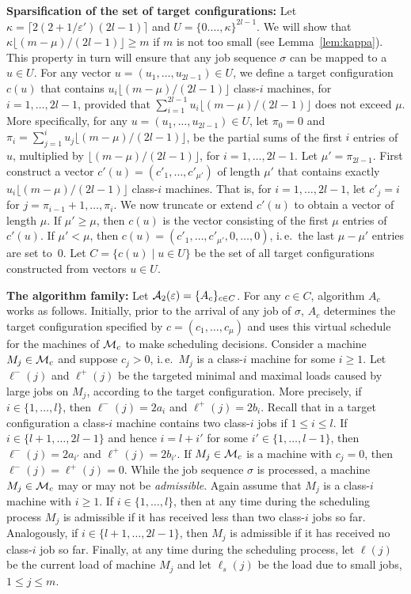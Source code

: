 \documentclass{llncs}
\newcommand{\eps}{\varepsilon}
\begin{document}
{\bf Sparsification of the set of target configurations:} Let $\kappa = \lceil 2(2+1/\eps')(2l-1)\rceil$ and
$U = \{0.\ldots, \kappa\}^{2l-1}$. We will show that 
$\kappa \lfloor (m-\mu)/(2l-1) \rfloor \geq m$ if $m$ is not too small (see Lemma~\ref{lem:kappa}).
This property in turn will ensure that any job sequence $\sigma$ can be mapped to a $u\in U$.
For any vector $u = (u_1, \ldots, u_{2l-1})\in U$, we define a target configuration
$c(u)$ that contains $u_i \lfloor (m-\mu)/(2l-1) \rfloor$ class-$i$ machines, for $i=1, \ldots, 2l-1$, 
provided that $\sum_{i=1}^{2l-1} u_i \lfloor (m-\mu)/(2l-1) \rfloor$ does not exceed $\mu$. More specifically,
for any $u = (u_1, \ldots, u_{2l-1})\in U$, let $\pi_0=0$ and $\pi_i = \sum_{j=1}^i u_j \lfloor (m-\mu)/(2l-1) \rfloor$,
be the partial sums of the first $i$ entries of $u$, multiplied by $\lfloor (m-\mu)/(2l-1) \rfloor$, for
$i=1, \ldots, 2l-1$. Let $\mu'= \pi_{2l-1}$. First construct a vector $c'(u) = (c'_1, \ldots, c'_{\mu'})$
of length $\mu'$ that contains exactly $u_i \lfloor (m-\mu)/(2l-1) \rfloor$ class-$i$ machines.
That is, for $i=1, \ldots, 2l-1$, let $c'_j = i$ for $j=\pi_{i-1}+1, \ldots, \pi_i$. We now truncate
or extend $c'(u)$ to obtain a vector of length $\mu$. If $\mu'\geq \mu$, then $c(u)$ is the vector consisting
of the first $\mu$ entries of $c'(u)$. If $\mu'< \mu$, then $c(u) = (c'_1, \ldots, c'_{\mu'}, 0, \ldots, 0)$, i.\,e.\
the last $\mu-\mu'$ entries are set to~0. Let $C= \{c(u) \mid u\in U\}$ be the set of all target configurations
constructed from vectors $u\in U$.

{\bf The algorithm family:} Let ${\cal A}_2(\eps) = \{A_c\}_{c\in C}$. For any $c\in C$, algorithm
$A_c$ works as follows. Initially, prior to the arrival of any job of $\sigma$, $A_c$ determines
the target configuration specified by $c= (c_1, \ldots, c_{\mu})$ and uses this virtual schedule for
the machines of ${\cal M}_c$ to make scheduling decisions. Consider a machine $M_j\in {\cal M}_c$ and
suppose $c_j >0$, i.\,e.\ $M_j$ is a class-$i$ machine  for some $i\geq 1$. Let $\ell^-(j)$ and $\ell^+(j)$
be the targeted minimal and maximal loads caused by large jobs on $M_j$, according to the target
configuration. More precisely, if $i\in \{1,\ldots, l\}$, then  $\ell^-(j) = 2a_i$ and  $\ell^+(j)=2b_i$. 
Recall that in a target configuration a class-$i$ machine contains two class-$i$ jobs if $1\leq i \leq l$.
If $i\in \{l+1,\ldots, 2l-1\}$ and hence $i = l+i'$ for some $i'\in \{1,\ldots, l-1\}$, then  $\ell^-(j) = 2a_{i'}$ 
and  $\ell^+(j)=2b_{i'}$. If $M_j \in {\cal M}_c$ is 
a machine with $c_j = 0$, then $ \ell^-(j)  = \ell^+(j) = 0$. While the job sequence $\sigma$ is processed,
a machine $M_j\in {\cal M}_c$ may or may not be {\em admissible\/}. Again assume that $M_j$ is a class-$i$
machine with $i\geq 1$. If $i\in \{1, \ldots, l\}$, then at any time during the scheduling process $M_j$ is
admissible if it has received less than two class-$i$ jobs so far. Analogously, if  $i\in \{l+1, \ldots, 2l-1\}$,
then $M_j$ is admissible if it has received no class-$i$ job so far. Finally, at any time during the
scheduling process, let $\ell(j)$ be the current load of machine $M_j$ and let $\ell_s(j)$ be the
load due to small jobs, $1\leq j \leq m$.
\end{document}
